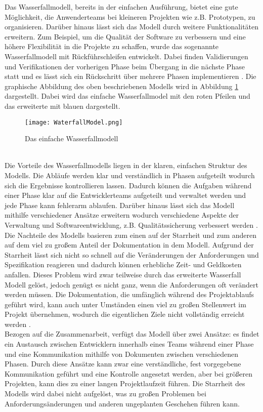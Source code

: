 Das Wasserfallmodell, bereits in der einfachen Ausführung, bietet eine gute Möglichkeit, die Anwenderteams bei kleineren Projekten wie z.B. Prototypen, zu organisieren. 
Darüber hinaus lässt sich das Modell durch weitere Funktionalitäten erweitern. Zum Beispiel, um die Qualität der Software zu verbessern und eine höhere Flexibilität in die Projekte zu schaffen, wurde das sogenannte \glqq Wasserfallmodell mit Rückführschleifen\grqq{} entwickelt.
Dabei finden Validierungen und Verifikationen der vorherigen Phase beim Übergang in die nächste Phase statt und es lässt sich ein \glqq Rückschritt\grqq{} über mehrere Phasen implementieren \cite[86,87]{Goll:2011:Methoden:}.
Die graphische Abbildung des oben beschriebenen Modells wird in Abbildung \ref{fig:waterfallModel} dargestellt. Dabei wird das einfache Wasserfallmodel mit den roten Pfeilen und das erweiterte mit blauen dargestellt.   
\begin{figure}
\centering
    \texttt{[image: WaterfallModel.png]} 
    \caption{Das einfache Wasserfallmodell}
    \label{fig:waterfallModel}
\end{figure}
\\
Die Vorteile des Wasserfallmodells liegen in der klaren, einfachen Struktur des Modells. Die Abläufe werden klar und verständlich in Phasen aufgeteilt wodurch sich die Ergebnisse kontrollieren lassen.
Dadurch können die Aufgaben während einer Phase klar auf die Entwicklerteams aufgeteilt und verwaltet werden und jede Phase kann fehlerarm ablaufen. Darüber hinaus lässt sich das Modell mithilfe verschiedener Ansätze
erweitern wodurch verschiedene Aspekte der Verwaltung und Softwareentwicklung, z.B. Qualitätssicherung verbessert werden \cite[84-87]{Goll:2011:Methoden:} \cite[14]{Kyer:2019:Overview:}.  
\\Die Nachteile des Modells basieren zum einen auf der Starrheit und zum anderen auf dem viel zu großem Anteil der Dokumentation in dem Modell.
Aufgrund der Starrheit lässt sich nicht so schnell auf die Veränderungen der Anforderungen und Spezifikation reagieren und dadurch können erhebliche Zeit- und Geldkosten anfallen. 
Dieses Problem wird zwar teilweise durch das erweiterte Wasserfall Modell gelöst, jedoch genügt es nicht ganz, wenn die Anforderungen oft verändert werden müssen. Die Dokumentation, die umfänglich während des Projektablaufs geführt wird, 
kann auch unter Umständen einen viel zu großen Stellenwert im Projekt übernehmen, wodurch die eigentlichen Ziele nicht vollständig erreicht werden \cite[14]{Kyer:2019:Overview:} \cite{IJC:2015:Related:}.
\\Bezogen auf die Zusammenarbeit, verfügt das Modell über zwei Ansätze: es findet ein Austausch zwischen Entwicklern innerhalb eines Teams während einer Phase und eine Kommunikation mithilfe von Dokumenten zwischen verschiedenen Phasen. 
Durch diese Ansätze kann zwar eine verständliche, fest vorgegebene Kommunikation geführt und eine Kontrolle angesetzt werden, aber bei größeren Projekten, kann dies zu einer langen Projektlaufzeit führen. 
Die Starrheit des Modells wird dabei nicht aufgelöst, was zu großen Problemen bei Anforderungsänderungen und anderen ungeplanten Geschehen führen kann. 

